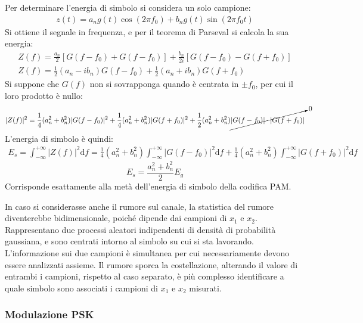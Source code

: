 \documentclass{article}
\newcommand{\df}{\mathrm{d}}
\newcommand{\intinf}{\displaystyle\int_{-\infty}^{+\infty}}
\numberwithin{equation}{subsection}
\begin{document}
Per determinare l'energia di simbolo si considera un solo campione:
\begin{gather*}
    z(t)=a_ng(t)\cos(2\pi f_0)+b_ng(t)\sin(2\pi f_0t)
\end{gather*}
Si ottiene il segnale in frequenza, e per il teorema di Parseval si calcola la sua energia:
\begin{gather*}
    Z(f)=\displaystyle\frac{a_n}{2}\left[G(f-f_0)+G(f-f_0)\right]+\frac{b_n}{2i}\left[G(f-f_0)-G(f+f_0)\right]\\
    Z(f)=\displaystyle\frac{1}{2}(a_n-ib_n)G(f-f_0)+\frac{1}{2}(a_n+ib_n)G(f+f_0)
\end{gather*}
Si suppone che $G(f)$ non si sovrapponga quando è centrata in $\pm f_0$, per cui il loro prodotto è nullo:
\begin{gather*}
    |Z(f)|^2=\displaystyle\frac{1}{4}(a_n^2+b_n^2)|G(f-f_0)|^2+\frac{1}{4}(a_n^2+b_n^2)|G(f+f_0)|^2+\frac{1}{2}(a_n^2+b_n^2)\cancelto{0}{|G(f-f_0)|\cdot|G(f+f_0)|}
\end{gather*}
L'energia di simbolo è quindi:
\begin{gather*}
    E_s=\intinf |Z(f)|^2\df f=\frac{1}{4}(a_n^2+b_n^2)\intinf |G(f-f_0)|^2\df f+\frac{1}{4}(a_n^2+b_n^2)\intinf |G(f+f_0)|^2\df f
\end{gather*}
\begin{equation}
    E_s=\displaystyle\frac{a_n^2+b_n^2}{2}E_g
\end{equation}
Corrisponde esattamente alla metà dell'energia di simbolo della codifica PAM. 

In caso si considerasse anche il rumore sul canale, la statistica del rumore diventerebbe bidimensionale, poiché dipende dai campioni di $x_1$ e $x_2$. Rappresentano 
due processi aleatori indipendenti di densità di probabilità gaussiana, e sono centrati intorno al simbolo su cui si sta lavorando. L'informazione sui due campioni è 
simultanea per cui necessariamente devono essere analizzati assieme. Il rumore sporca la costellazione, alterando il valore di entrambi i campioni, rispetto al 
caso separato, è più complesso identificare a quale simbolo sono associati i campioni di $x_1$ e $x_2$ misurati. 

\subsubsection{Modulazione PSK}
\end{document}
